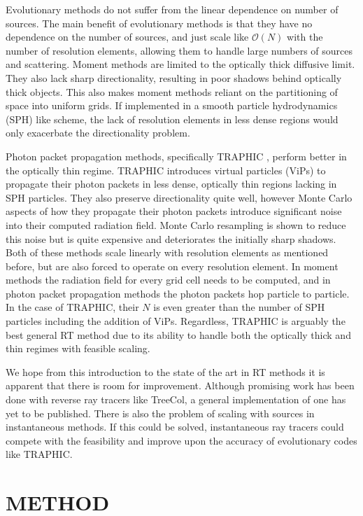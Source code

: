\documentclass[fleq,usenatbib]{mnras}
\begin{document}
Evolutionary methods do not suffer from the linear dependence on number of 
sources. The main benefit of evolutionary methods is that they have no 
dependence on the number of sources, and just scale like $\mathcal{O}(N)$ with
the number of resolution elements, allowing them to handle large numbers of 
sources and scattering. Moment methods are limited to the optically thick 
diffusive limit. They also lack sharp directionality, resulting in poor shadows
behind optically thick objects. This also makes moment methods reliant on the 
partitioning of space into uniform grids. If implemented in a smooth particle 
hydrodynamics (SPH) like scheme, the lack of resolution elements in less dense 
regions would only exacerbate the directionality problem. 

Photon packet propagation methods, specifically TRAPHIC 
\citep{pawlikSchaye08}, perform better in the optically thin regime. TRAPHIC 
introduces virtual particles (ViPs) to propagate their photon packets in less 
dense, optically thin regions lacking in SPH particles. They also preserve 
directionality quite well, however Monte Carlo aspects of how they propagate 
their photon packets introduce significant noise into their computed radiation 
field. Monte Carlo resampling is shown to reduce this noise but is quite 
expensive and deteriorates the initially sharp shadows. Both of these methods 
scale linearly with resolution elements as mentioned before, but are also 
forced to operate on every resolution element. In moment methods the radiation 
field for every grid cell needs to be computed, and in photon packet 
propagation methods the photon packets hop particle to particle. In the case 
of TRAPHIC, their $N$ is even greater than the number of SPH particles 
including the addition of ViPs. Regardless, TRAPHIC is arguably the best 
general RT method due to its ability to handle both the optically thick and 
thin regimes with feasible scaling.

We hope from this introduction to the state of the art in RT methods it is 
apparent that there is room for improvement. Although promising work has been 
done with reverse ray tracers like TreeCol, a general implementation of one 
has yet to be published. There is also the problem of scaling with sources in 
instantaneous methods. If this could be solved, instantaneous ray tracers 
could compete with the feasibility and improve upon the accuracy of 
evolutionary codes like TRAPHIC.

\section{METHOD}\label{sec:mthd}
\end{document}
